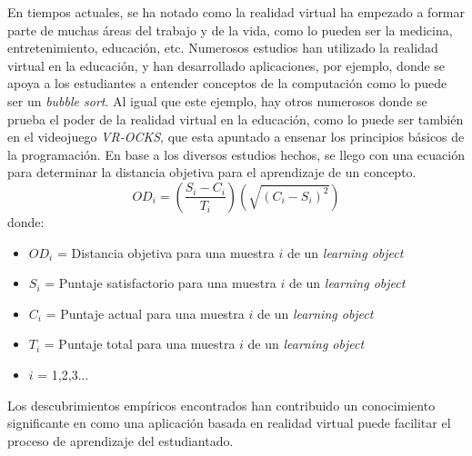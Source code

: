 En tiempos actuales, se ha notado como la realidad virtual ha empezado a formar parte de muchas áreas del trabajo y de la vida, como lo pueden ser la medicina, entretenimiento, educación, etc. Numerosos estudios han utilizado la realidad virtual en la educación, y han desarrollado aplicaciones, por ejemplo, donde se apoya a los estudiantes a entender conceptos de la computación como lo puede ser un \textit{bubble sort}. Al igual que este ejemplo, hay otros numerosos donde se prueba el poder de la realidad virtual en la educación, como lo puede ser también en el videojuego \textit{VR-OCKS}, que esta apuntado a ensenar los principios básicos de la programación. En base a los diversos estudios hechos, se llego con una ecuación para determinar la distancia objetiva para el aprendizaje de un concepto.
\begin{equation}
    OD_i = \left(\frac{S_i - C_i}{T_i}\right) \left(\sqrt{(C_i - S_i)^2}\right) 
   \label{eq:distancia-objetiva}
\end{equation}
donde:
\begin{itemize}
   \item $ OD_i $ = Distancia objetiva para una muestra $i$ de un \textit{learning object}
   \item $ S_i $ = Puntaje satisfactorio para una muestra $i$ de un \textit{learning object}
   \item $ C_i $ = Puntaje actual para una muestra $i$ de un \textit{learning object}
   \item $ T_i $ = Puntaje total para una muestra $i$ de un \textit{learning object}
   \item $ i $ = 1,2,3...
\end{itemize}
Los descubrimientos empíricos encontrados han contribuido un conocimiento significante en como una aplicación basada en realidad virtual puede facilitar el proceso de aprendizaje del estudiantado. \cite{OYELERE2023100016}
